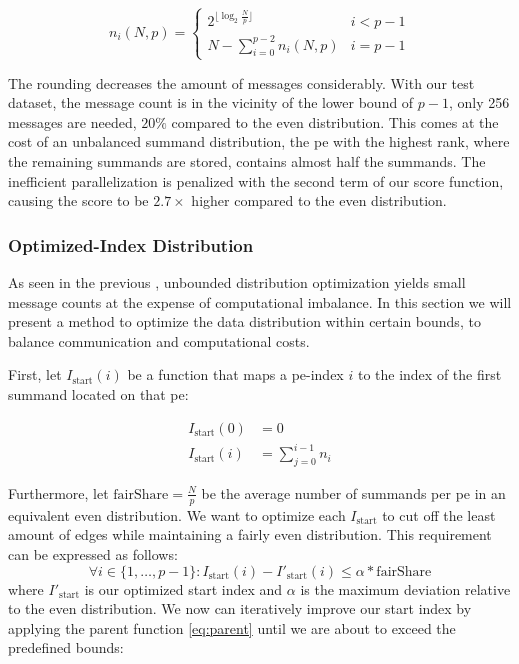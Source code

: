 \begin{equation}
\label{eq:roundDownPower2Distribution}
n_i (N, p) = \begin{cases}
2^{\lfloor \log_2 \frac{N}{p} \rfloor} & i < p - 1\\
N - \sum_{i=0}^{p-2} n_i (N,p) & i = p - 1
\end{cases}
\end{equation}

The rounding decreases the amount of messages considerably. With our test dataset, the message count is in the vicinity of the lower bound of $p - 1$, only
256 messages are needed, $20\%$ compared to the even distribution. This comes at the cost of an unbalanced summand distribution, the \gls{pe}
with the highest rank, where the remaining summands are stored, contains almost half the summands.
The inefficient parallelization is penalized with the second term of our score function, causing the score to be $2.7\times$ higher compared to
the even distribution.

\subsubsection{Optimized-Index Distribution}
As seen in the previous , unbounded distribution optimization yields small message counts at the expense of computational imbalance.
In this section we will present a method to optimize the data distribution within certain bounds, to balance communication and computational costs.

First, let $I_\textrm{start}(i)$ be a function that maps a \gls{pe}-index $i$ to the index of the first summand located on that \gls{pe}:

\begin{align}
\label{eq:startIndexDefinition}
I_\textrm{start}(0) &= 0 \\
I_\textrm{start}(i) &= \sum_{j=0}^{i - 1} n_i
\end{align}

Furthermore, let $\textrm{fairShare} = \tfrac{N}{p}$ be the average number of summands per \gls{pe} in an equivalent even distribution. We want to optimize each $I_\textrm{start}$ to cut off the least amount of edges while maintaining a fairly even distribution. This requirement can be expressed as follows:
\begin{equation}
\label{eq:optimizedIndexBounds}
\forall i \in \{1, \ldots, p - 1\}: I_\textrm{start}(i) - I'_\textrm{start}(i) \leq \alpha * \textrm{fairShare}
\end{equation}
where $I'_\textrm{start}$ is our optimized start index and $\alpha$ is the maximum deviation relative to the even distribution.
We now can iteratively improve our start index by applying the parent function \ref{eq:parent} until we are about to exceed the predefined bounds:

